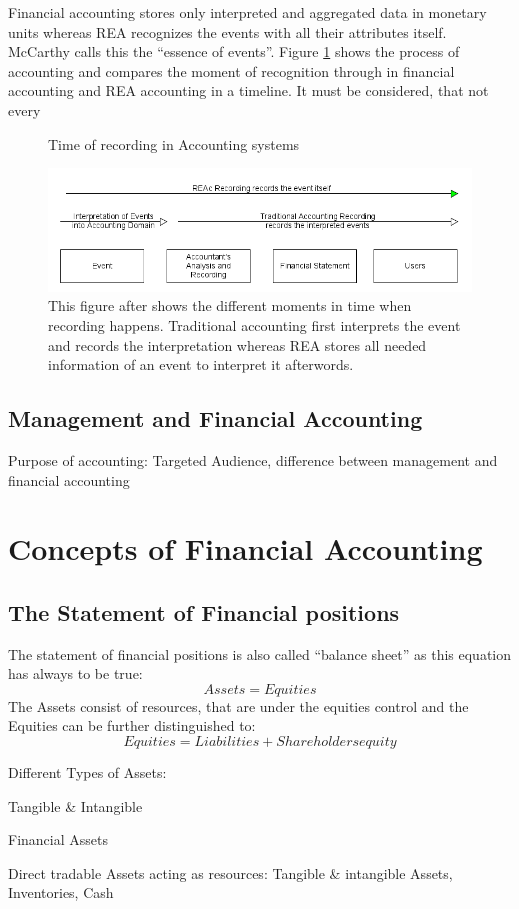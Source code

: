 Financial accounting stores only interpreted and aggregated data in monetary units whereas REA recognizes the events with all their attributes itself.
McCarthy calls this the \enquote{essence of events}.
Figure \ref{fig:EventsTimeOfRecording} shows the process of accounting and compares the moment of recognition through in financial accounting and REA accounting in a timeline.
It must be considered, that not every
\begin{figure}
	\centering
	\caption{Time of recording in Accounting systems}
	\label{fig:EventsTimeOfRecording}
	\includegraphics[width=0.7\linewidth]{"../figures/EventsTimeOfRecording"}
	\caption*{This figure after \cite{Horngren1984} shows the different moments in time when recording happens. Traditional accounting first interprets the event and records the interpretation whereas REA stores all needed information of an event to interpret it afterwords.}
\end{figure}

\subsection{Management and Financial Accounting}
Purpose of accounting: Targeted Audience, difference between management and
financial accounting
\section{Concepts of Financial Accounting}
\subsection{The Statement of Financial positions}
The statement of financial positions is also called \enquote{balance sheet} as this equation has always to be true:
\[ Assets = Equities \]
The Assets consist of resources, that are under the equities control and the Equities can be further distinguished to:
\[ Equities = Liabilities + Shareholders equity\]


Different Types of Assets:

Tangible \& Intangible

Financial Assets

Direct tradable Assets acting as resources: Tangible \& intangible Assets,
Inventories, Cash

